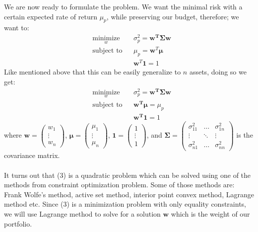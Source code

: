 \documentclass[12pt,titlepage,letter]{article}
\begin{document}
			We are now ready to formulate the problem. We want the minimal risk with a certain expected rate of return $\mu_p$, while preserving our budget, therefore; we want to: 
			\begin{equation}
				\begin{aligned}
					& \underset{w}{\text{minimize}}
					& &\sigma_p^2 = \mathbf{w^T\Sigma w}\\
					& \text{subject to}
					& & \mu_p = \mathbf{w}^T\pmb{\mu} \\
					&&& \mathbf{w}^T\mathbf{1}=1
				\end{aligned}
			\end{equation}
			Like mentioned above that this can be easily generalize to $n$ assets, doing so we get: 
			\begin{equation}
				\begin{aligned}
					& \underset{w}{\text{minimize}}
					& &\sigma_p^2 = \mathbf{w^T\Sigma w}\\
					& \text{subject to}
					& & \mathbf{w^T}\pmb{\mu} = \mu_p \\
					&&& \mathbf{w^T1}=1
				\end{aligned}
			\end{equation}
			where $\mathbf{w} = \begin{pmatrix} w_1 \\ \vdots \\ w_n \end{pmatrix}$, $\pmb{\mu} = \begin{pmatrix} \mu_1 \\ \vdots \\ \mu_n \end{pmatrix}$, $\mathbf{1} = \begin{pmatrix}1 \\ \vdots \\ 1 \end{pmatrix}$, and $\mathbf{\Sigma} = \begin{pmatrix}\sigma_{11}^2 & \dots & \sigma_{1n}^2 \\ \vdots & \ddots & \vdots\\  \sigma_{n1}^2 & \dots & \sigma_{nn}^2 \end{pmatrix}$ is the covariance matrix.\\ \\ 
			It turns out that (3) is a quadratic problem which can be solved using one of the methods from constraint optimization problem. Some of those methods are: Frank Wolfe's method, active set method, interior point convex method, Lagrange method etc. Since (3) is a minimization problem with only equality constraints, we will use Lagrange method to solve for a solution $\mathbf{w}$ which is the weight of our portfolio. 
\end{document}
